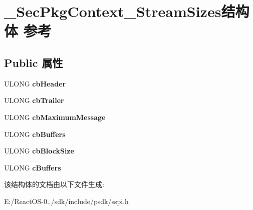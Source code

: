 \hypertarget{struct___sec_pkg_context___stream_sizes}{}\section{\+\_\+\+Sec\+Pkg\+Context\+\_\+\+Stream\+Sizes结构体 参考}
\label{struct___sec_pkg_context___stream_sizes}
\subsection*{Public 属性}
\begin{DoxyCompactItemize}
\item 
\mbox{\label{struct___sec_pkg_context___stream_sizes_a7f6f602937437e3da60c5dd5814c9b0c}} 
U\+L\+O\+NG {\bfseries cb\+Header}
\item 
\mbox{\label{struct___sec_pkg_context___stream_sizes_a67000853d3f9bf914f69f4e108a1ce2b}} 
U\+L\+O\+NG {\bfseries cb\+Trailer}
\item 
\mbox{\label{struct___sec_pkg_context___stream_sizes_a4f328084f1fe159fba7c146fe77a8674}} 
U\+L\+O\+NG {\bfseries cb\+Maximum\+Message}
\item 
\mbox{\label{struct___sec_pkg_context___stream_sizes_a864287f7c1cc5ac278009ecfbbbf2da1}} 
U\+L\+O\+NG {\bfseries cb\+Buffers}
\item 
\mbox{\label{struct___sec_pkg_context___stream_sizes_a947785fdd57a2a63a99d6adec174f1d8}} 
U\+L\+O\+NG {\bfseries cb\+Block\+Size}
\item 
\mbox{\label{struct___sec_pkg_context___stream_sizes_ac2988be36ad0285bc53f4d8233121883}} 
U\+L\+O\+NG {\bfseries c\+Buffers}
\end{DoxyCompactItemize}


该结构体的文档由以下文件生成\+:\begin{DoxyCompactItemize}
\item 
E\+:/\+React\+O\+S-\/0../sdk/include/psdk/sspi.\+h\end{DoxyCompactItemize}

